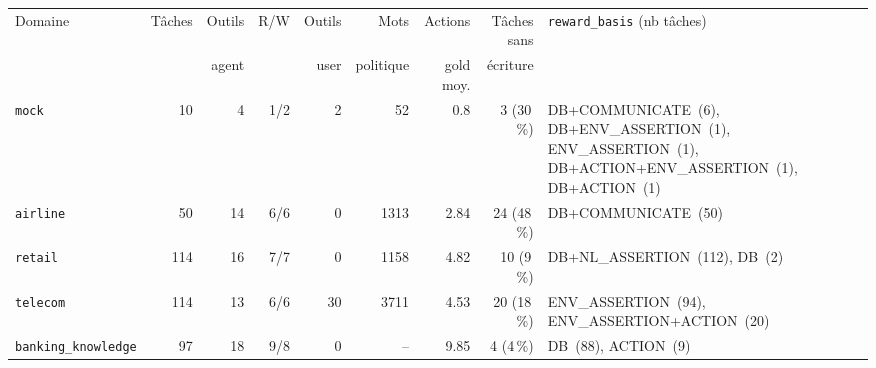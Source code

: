 \begin{tabular}{lrrrrrrr>{\raggedright\arraybackslash}p{7cm}}
\toprule
Domaine & Tâches & Outils & R/W & Outils & Mots & Actions & Tâches sans & \texttt{reward\_basis} (nb tâches) \\
 & & agent & & user & politique & gold moy. & écriture & \\
\midrule
\texttt{mock} & 10 & 4 & 1/2 & 2 & 52 & 0.8 & 3 (30\,\%) & DB+\allowbreak COMMUNICATE~(6), DB+\allowbreak ENV\_ASSERTION~(1), ENV\_ASSERTION~(1), DB+\allowbreak ACTION+\allowbreak ENV\_ASSERTION~(1), DB+\allowbreak ACTION~(1) \\
\texttt{airline} & 50 & 14 & 6/6 & 0 & 1313 & 2.84 & 24 (48\,\%) & DB+\allowbreak COMMUNICATE~(50) \\
\texttt{retail} & 114 & 16 & 7/7 & 0 & 1158 & 4.82 & 10 (9\,\%) & DB+\allowbreak NL\_ASSERTION~(112), DB~(2) \\
\texttt{telecom} & 114 & 13 & 6/6 & 30 & 3711 & 4.53 & 20 (18\,\%) & ENV\_ASSERTION~(94), ENV\_ASSERTION+\allowbreak ACTION~(20) \\
\texttt{banking\_knowledge} & 97 & 18 & 9/8 & 0 & -- & 9.85 & 4 (4\,\%) & DB~(88), ACTION~(9) \\
\bottomrule
\end{tabular}
